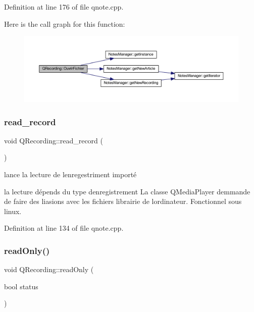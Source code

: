 Definition at line 176 of file qnote.\+cpp.

Here is the call graph for this function\+:\nopagebreak
\begin{figure}[H]
\begin{center}
\leavevmode
\includegraphics[width=350pt]{class_q_recording_a9eaf976da6c3c768d15a5e53f3982753_cgraph}
\end{center}
\end{figure}
\mbox{\label{class_q_recording_a5c5c221fed1648c1813da1f195e26663}} 
\subsubsection{\texorpdfstring{read\+\_\+record}{read\_record}}
{\footnotesize\ttfamily void Q\+Recording\+::read\+\_\+record (\begin{DoxyParamCaption}{ }\end{DoxyParamCaption})\hspace{0.3cm}{\ttfamily [slot]}}



lance la lecture de l\textquotesingle{}enregestriment importé 

la lecture dépends du type d\textquotesingle{}enregistrement La classe Q\+Media\+Player demmande de faire des liasions avec les fichiers librairie de l\textquotesingle{}ordinateur. Fonctionnel sous linux. 

Definition at line 134 of file qnote.\+cpp.

\mbox{\label{class_q_recording_a98fa21d8814450c0d912c8ce102ca832}} 
\subsubsection{\texorpdfstring{read\+Only()}{readOnly()}}
{\footnotesize\ttfamily void Q\+Recording\+::read\+Only (\begin{DoxyParamCaption}\item[{bool}]{status }\end{DoxyParamCaption})\hspace{0.3cm}{\ttfamily [virtual]}}



